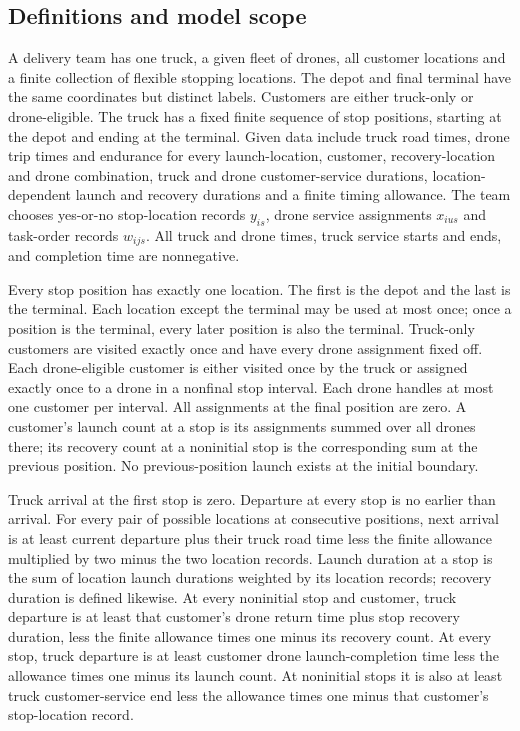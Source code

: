 \documentclass[10pt]{article}
\begin{document}
\subsection*{Definitions and model scope}
A delivery team has one truck, a given fleet of drones, all customer locations and a finite collection of flexible stopping locations. The depot and final terminal have the same coordinates but distinct labels. Customers are either truck-only or drone-eligible. The truck has a fixed finite sequence of stop positions, starting at the depot and ending at the terminal. Given data include truck road times, drone trip times and endurance for every launch-location, customer, recovery-location and drone combination, truck and drone customer-service durations, location-dependent launch and recovery durations and a finite timing allowance. The team chooses yes-or-no stop-location records $y_{is}$, drone service assignments $x_{ius}$ and task-order records $w_{ijs}$. All truck and drone times, truck service starts and ends, and completion time are nonnegative.

Every stop position has exactly one location. The first is the depot and the last is the terminal. Each location except the terminal may be used at most once; once a position is the terminal, every later position is also the terminal. Truck-only customers are visited exactly once and have every drone assignment fixed off. Each drone-eligible customer is either visited once by the truck or assigned exactly once to a drone in a nonfinal stop interval. Each drone handles at most one customer per interval. All assignments at the final position are zero. A customer's launch count at a stop is its assignments summed over all drones there; its recovery count at a noninitial stop is the corresponding sum at the previous position. No previous-position launch exists at the initial boundary.

Truck arrival at the first stop is zero. Departure at every stop is no earlier than arrival. For every pair of possible locations at consecutive positions, next arrival is at least current departure plus their truck road time less the finite allowance multiplied by two minus the two location records. Launch duration at a stop is the sum of location launch durations weighted by its location records; recovery duration is defined likewise. At every noninitial stop and customer, truck departure is at least that customer's drone return time plus stop recovery duration, less the finite allowance times one minus its recovery count. At every stop, truck departure is at least customer drone launch-completion time less the allowance times one minus its launch count. At noninitial stops it is also at least truck customer-service end less the allowance times one minus that customer's stop-location record.
\end{document}
